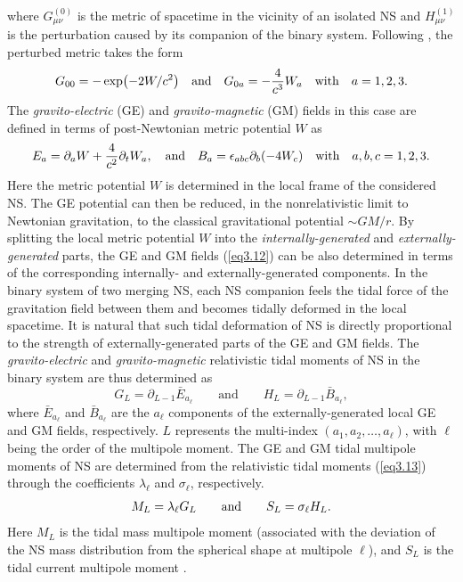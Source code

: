 where $G^{(0)}_{\mu\nu}$ is the metric of spacetime in the vicinity of an isolated \gls{NS} 
and $H^{(1)}_{\mu\nu}$ is the perturbation caused by its companion of the binary system. 
Following \cite{damour2009relativistic}, the perturbed metric takes the form 
\begin{equation}
    G_{00} = -\exp(-2W/c^2) \quad {\rm and}\quad G_{0a} = - \frac{4}{c^3} W_a \quad \text{with}\quad a=1,2,3.
		\label{eq3.11}
\end{equation}
The \emph{gravito-electric} (\gls{GE}) and \emph{gravito-magnetic} (\gls{GM}) fields 
in this case are defined in terms of post-Newtonian metric potential $W$ as
\begin{equation}
    E_a = \partial_a W + \frac{4}{c^2} \partial_t W_a,\quad {\rm and}\quad  
    B_a = \epsilon_{abc}\partial_b(-4W_c) \quad\text{with}\quad a,b,c=1,2,3. \label{eq3.12}
\end{equation}
Here the metric potential $W$ is determined in the local frame of the considered
NS. The \gls{GE} potential can then be reduced, in the nonrelativistic limit to 
Newtonian gravitation, to the classical gravitational potential $\sim GM/r$. 
By splitting the local metric potential $W$ into the \emph{internally-generated} and
\emph{externally-generated} parts, the GE and GM fields (\ref{eq3.12}) can be also
determined in terms of the corresponding internally- and externally-generated 
components. In the binary system of two merging NS, each NS companion feels
the tidal force of the gravitation field between them and becomes tidally deformed
in the local spacetime. It is natural that such tidal deformation of \gls{NS} 
is directly proportional to the strength of externally-generated parts of the GE 
and GM fields. The \emph{gravito-electric} and \emph{gravito-magnetic} relativistic tidal
moments of NS in the binary system are thus determined \citep{damour2009relativistic} as 
\begin{equation}
  G_L=\partial_{L-1} \bar{E}_{a_\ell} \qquad\text{and}\qquad 
	H_L = \partial_{L-1} \bar{B}_{a_\ell}, \label{eq3.13}
\end{equation}
where $\bar{E}_{a_\ell}$ and $\bar{B}_{a_\ell}$ are the $a_\ell$ components of the 
externally-generated local \gls{GE} and \gls{GM} fields, respectively. 
$L$ represents the multi-index $(a_1, a_2,\ldots, a_\ell)$, with $\ell$ being 
the order of the multipole moment. The GE and GM tidal multipole moments 
of NS are determined from the relativistic tidal moments (\ref{eq3.13}) through 
the coefficients $\lambda_\ell$ and $\sigma_\ell$, respectively.
\begin{equation}
    M_L=\lambda_\ell G_L \qquad {\rm and}\qquad S_L=\sigma_\ell H_L. \label{eq3.14}
\end{equation}
Here $M_L$ is the tidal mass multipole moment (associated with the deviation of the NS
mass distribution from the spherical shape at multipole $\ell$), and $S_L$ is the 
tidal current multipole moment \citep{damour2009relativistic,perot2021role}. 

